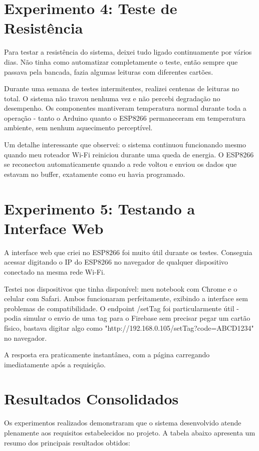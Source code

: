 \section{Experimento 4: Teste de Resistência}

Para testar a resistência do sistema, deixei tudo ligado continuamente por vários dias. Não tinha como automatizar completamente o teste, então sempre que passava pela bancada, fazia algumas leituras com diferentes cartões.

Durante uma semana de testes intermitentes, realizei centenas de leituras no total. O sistema não travou nenhuma vez e não percebi degradação no desempenho. Os componentes mantiveram temperatura normal durante toda a operação - tanto o Arduino quanto o ESP8266 permaneceram em temperatura ambiente, sem nenhum aquecimento perceptível.

Um detalhe interessante que observei: o sistema continuou funcionando mesmo quando meu roteador Wi-Fi reiniciou durante uma queda de energia. O ESP8266 se reconectou automaticamente quando a rede voltou e enviou os dados que estavam no buffer, exatamente como eu havia programado.

\section{Experimento 5: Testando a Interface Web}

A interface web que criei no ESP8266 foi muito útil durante os testes. Conseguia acessar digitando o IP do ESP8266 no navegador de qualquer dispositivo conectado na mesma rede Wi-Fi.

Testei nos dispositivos que tinha disponível: meu notebook com Chrome e o celular com Safari. Ambos funcionaram perfeitamente, exibindo a interface sem problemas de compatibilidade. O endpoint /setTag foi particularmente útil - podia simular o envio de uma tag para o Firebase sem precisar pegar um cartão físico, bastava digitar algo como "http://192.168.0.105/setTag?code=ABCD1234" no navegador.

A resposta era praticamente instantânea, com a página carregando imediatamente após a requisição.


\section{Resultados Consolidados}

Os experimentos realizados demonstraram que o sistema desenvolvido atende plenamente aos requisitos estabelecidos no projeto. A tabela abaixo apresenta um resumo dos principais resultados obtidos:

